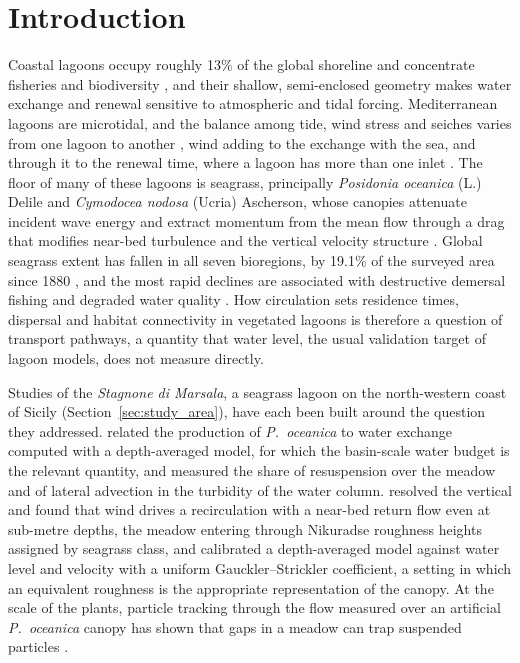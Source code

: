 \section{Introduction}
\label{sec:introduction}

Coastal lagoons occupy roughly 13\% of the global shoreline and concentrate
fisheries and biodiversity \citep{Carrasco2016, Newton2018}, and their
shallow, semi-enclosed geometry makes water exchange and renewal sensitive to
atmospheric and tidal forcing. Mediterranean lagoons are microtidal, and the
balance among tide, wind stress and seiches varies from one lagoon to another
\citep{Niedda2007}, wind adding to the exchange with the sea, and through it
to the renewal time, where a lagoon has more than one inlet
\citep{Umgiesser2014}. The floor of many of these lagoons is seagrass,
principally \emph{Posidonia oceanica} (L.) Delile and
\emph{Cymodocea nodosa} (Ucria) Ascherson, whose canopies attenuate incident
wave energy \citep{Infantes2012} and extract momentum from the mean flow
through a drag that modifies near-bed turbulence and the vertical velocity
structure \citep{Nepf2012}. Global seagrass extent has fallen in all seven
bioregions, by 19.1\% of the surveyed area since 1880 \citep{Waycott2009,
Dunic2021}, and the most rapid declines are associated with destructive
demersal fishing and degraded water quality \citep{Turschwell2021}. How circulation
sets residence times, dispersal and habitat connectivity in vegetated lagoons
is therefore a question of transport pathways, a quantity that water level,
the usual validation target of lagoon models, does not measure directly.

Studies of the \emph{Stagnone di Marsala}, a seagrass lagoon on the
north-western coast of Sicily (Section~\ref{sec:study_area}), have each been
built around the question they addressed. \citet{LaLoggia2004} related the
production of \emph{P.\ oceanica} to water exchange computed with a
depth-averaged model, for which the basin-scale water budget is the relevant
quantity, and \citet{DiMarca2009} measured the share of resuspension over the meadow and
of lateral advection in the turbidity of the water column. \citet{DeMarchis2012} resolved the vertical and
found that wind drives a recirculation with a near-bed return flow even at
sub-metre depths, the meadow entering through Nikuradse roughness heights
assigned by seagrass class, and \citet{Ingrassia2024} calibrated a
depth-averaged model against water level and velocity with a uniform
Gauckler--Strickler coefficient, a setting in which an equivalent roughness is
the appropriate representation of the canopy. At the scale of the plants,
particle tracking through the flow measured over an artificial
\emph{P.\ oceanica} canopy has shown that gaps in a meadow can trap suspended
particles \citep{Ciraolo2009a}.

